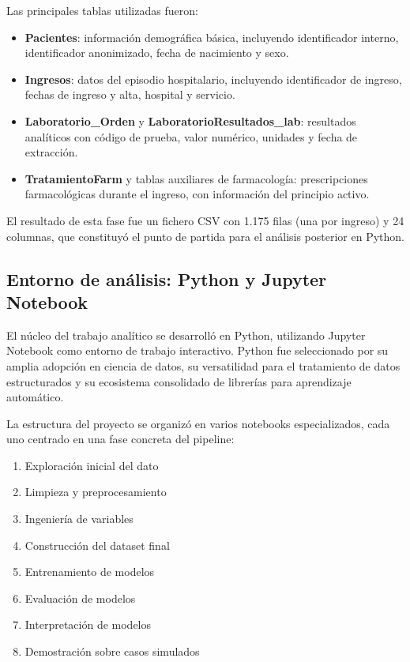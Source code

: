 \documentclass[12pt, a4paper, oneside]{report}
\begin{document}
Las principales tablas utilizadas fueron:

\begin{itemize}
    \item \textbf{Pacientes}: información demográfica básica, incluyendo identificador interno, identificador anonimizado, fecha de nacimiento y sexo.
    \item \textbf{Ingresos}: datos del episodio hospitalario, incluyendo identificador de ingreso, fechas de ingreso y alta, hospital y servicio.
    \item \textbf{Laboratorio\_Orden} y \textbf{LaboratorioResultados\_lab}: resultados analíticos con código de prueba, valor numérico, unidades y fecha de extracción.
    \item \textbf{TratamientoFarm} y tablas auxiliares de farmacología: prescripciones farmacológicas durante el ingreso, con información del principio activo.
\end{itemize}

El resultado de esta fase fue un fichero CSV con 1.175 filas (una por ingreso) y 24 columnas, que constituyó el punto de partida para el análisis posterior en Python.

\subsection{Entorno de análisis: Python y Jupyter Notebook}

El núcleo del trabajo analítico se desarrolló en Python, utilizando Jupyter Notebook como entorno de trabajo interactivo. Python fue seleccionado por su amplia adopción en ciencia de datos, su versatilidad para el tratamiento de datos estructurados y su ecosistema consolidado de librerías para aprendizaje automático.

La estructura del proyecto se organizó en varios notebooks especializados, cada uno centrado en una fase concreta del pipeline:

\begin{enumerate}
    \item Exploración inicial del dato
    \item Limpieza y preprocesamiento
    \item Ingeniería de variables
    \item Construcción del dataset final
    \item Entrenamiento de modelos
    \item Evaluación de modelos
    \item Interpretación de modelos
    \item Demostración sobre casos simulados
\end{enumerate}
\end{document}
